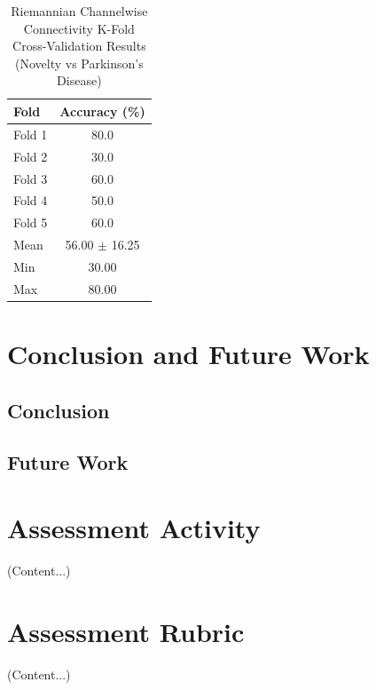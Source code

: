 \documentclass[12pt]{report}
\begin{document}
\begin{table}[h]
\centering
\caption{Riemannian Channelwise Connectivity K-Fold Cross-Validation Results (Novelty vs Parkinson's Disease)}
\begin{tabular}{lc}
\hline
\textbf{Fold} & \textbf{Accuracy (\%)} \\
\hline
Fold 1 & 80.0 \\
Fold 2 & 30.0 \\
Fold 3 & 60.0 \\
Fold 4 & 50.0 \\
Fold 5 & 60.0 \\
\hline
Mean & 56.00 $\pm$ 16.25 \\
Min & 30.00 \\
Max & 80.00 \\
\hline
\end{tabular}
\end{table}


\chapter{Conclusion and Future Work}


\section{Conclusion}


\section{Future Work}





\begin{appendices}

\chapter{Assessment Activity}
(Content...)

\chapter{Assessment Rubric}
(Content...)

\end{appendices}
\end{document}
